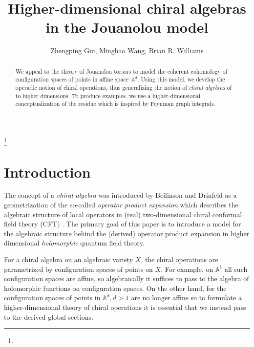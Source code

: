\documentclass[11pt]{amsart}
\theoremstyle{definition}
\theoremstyle{remark}
\numberwithin{equation}{section}
\begin{document}
\title[]{Higher-dimensional chiral algebras in the Jouanolou model}%
\author{Zhengping Gui, Minghao Wang, Brian R. Williams}%
\address{}%
\email{}%

\thanks{}%
\subjclass{}%
\keywords{}%

\begin{abstract}
We appeal to the theory of Jouanolou torsors to model the coherent cohomology of configuration spaces of points in
affine space~$\mathbb{A}^d$.
Using this model, we develop the operadic notion of chiral operations, thus generalizing the notion of \textit{chiral
algebras} of \cite{BD} to higher dimensions.
To produce examples, we use a higher-dimensional conceptualization of the residue which is inspired by Feynman
graph integrals.
\end{abstract}
\maketitle
\setcounter{tocdepth}{1}
\tableofcontents



\section*{Introduction}

The concept of a \textit{chiral algebra} was introduced by Beilinson and Drinfeld as a geometrization of the
so-called \textit{operator product expansion} which describes the algebraic structure of local operators in (real) two-dimensional chiral
conformal field theory (CFT) \cite{BD}.
The primary goal of this paper is to introduce a model for the algebraic structure behind the (derived) operator product
expansion in higher dimensional \textit{holomorphic} quantum field theory.

For a chiral algebra on an algebraic variety $X$, the chiral operations are parametrized by configuration spaces of
points on $X$.
For example, on $\mathbb{A}^1$ all such configuration spaces are affine, so algebraically it suffices to pass to the
algebra of holomorphic functions on configuration spaces.
On the other hand, for the configuration spaces of points in $\mathbb{A}^d, d > 1$ are no longer affine so to formulate a higher-dimensional theory of
chiral operations it is essential that we instead pass to the derived global sections.
\end{document}
